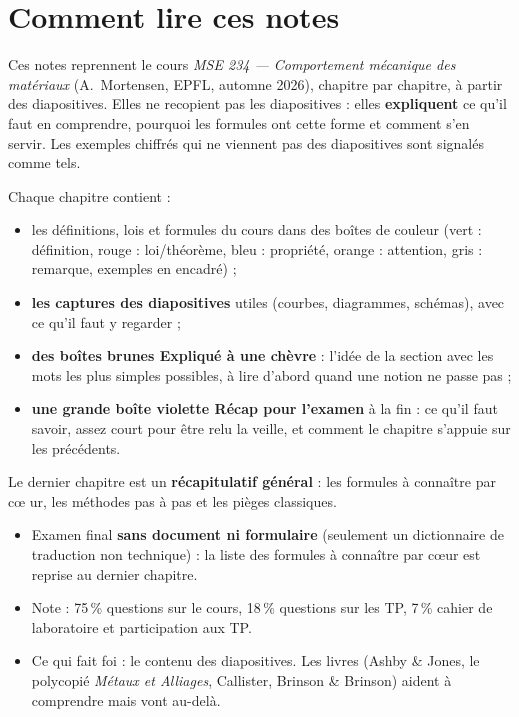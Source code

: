 \documentclass[11pt,a4paper,openany]{book}
\begin{document}
\raggedbottom


\tableofcontents
\clearpage

\chapter*{Comment lire ces notes}

Ces notes reprennent le cours \emph{MSE 234 --- Comportement mécanique des matériaux}
(A.~Mortensen, EPFL, automne 2026), chapitre par chapitre, à partir des diapositives. Elles ne
recopient pas les diapositives : elles \textbf{expliquent} ce qu'il faut en comprendre, pourquoi
les formules ont cette forme et comment s'en servir. Les exemples chiffrés qui ne viennent pas
des diapositives sont signalés comme tels.

Chaque chapitre contient :
\begin{itemize}
  \item les définitions, lois et formules du cours dans des boîtes de couleur (vert :
        définition, rouge : loi/théorème, bleu : propriété, orange : attention, gris :
        remarque, exemples en encadré) ;
  \item \textbf{les captures des diapositives} utiles (courbes, diagrammes, schémas), avec ce
        qu'il faut y regarder ;
  \item \textbf{des boîtes brunes \og Expliqué à une chèvre\fg{}} : l'idée de la section avec
        les mots les plus simples possibles, à lire d'abord quand une notion ne passe pas ;
  \item \textbf{une grande boîte violette \og Récap pour l'examen\fg{}} à la fin : ce qu'il
        faut savoir, assez court pour être relu la veille, et comment le chapitre s'appuie
        sur les précédents.
\end{itemize}
Le dernier chapitre est un \textbf{récapitulatif général} : les formules à connaître par c\oe
ur, les méthodes pas à pas et les pièges classiques.

\begin{rembox}[title={L'examen en deux mots (chapitre 0 du cours)}]
\begin{itemize}
  \item Examen final \textbf{sans document ni formulaire} (seulement un dictionnaire de
        traduction non technique) : la liste des \og formules à connaître par c\oe ur\fg{}
        est reprise au dernier chapitre.
  \item Note : 75\,\% questions sur le cours, 18\,\% questions sur les TP, 7\,\% cahier de
        laboratoire et participation aux TP.
  \item Ce qui fait foi : le contenu des diapositives. Les livres (Ashby \& Jones, le
        polycopié \emph{Métaux et Alliages}, Callister, Brinson \& Brinson) aident à
        comprendre mais vont au-delà.
\end{itemize}
\end{rembox}






\end{document}
